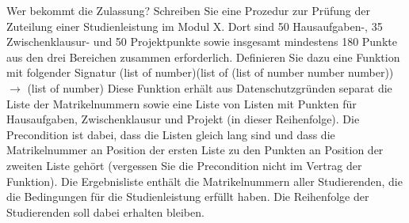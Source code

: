 \documentclass{../preamble}
\begin{document}
\begin{task}[credit = \stars{3}{3}]{Wer bekommt die Zulassung?}
    Schreiben Sie eine Prozedur zur Prüfung der Zuteilung einer Studienleistung im Modul X. Dort sind 50 Hausaufgaben-, 35 Zwischenklausur- und 50 Projektpunkte sowie insgesamt mindestens 180 Punkte aus den drei Bereichen zusammen erforderlich. Definieren Sie dazu eine Funktion  mit folgender Signatur
    \br
    (\textcolor{keywordcolor}{list} of \textcolor{keywordcolor}{number})(\textcolor{keywordcolor}{list} of (\textcolor{keywordcolor}{list} of \textcolor{keywordcolor}{number} \textcolor{keywordcolor}{number} \textcolor{keywordcolor}{number})) \(\rightarrow\) (\textcolor{keywordcolor}{list} of \textcolor{keywordcolor}{number})
    \br
    Diese Funktion erhält aus Datenschutzgründen separat die Liste der Matrikelnummern sowie eine Liste von Listen mit Punkten für Hausaufgaben, Zwischenklausur und Projekt (in dieser Reihenfolge). Die Precondition ist dabei, dass die Listen gleich lang sind und dass die Matrikelnummer an Position  der ersten Liste zu den Punkten an Position  der zweiten Liste gehört (vergessen Sie die Precondition nicht im Vertrag der Funktion). Die Ergebnisliste enthält die Matrikelnummern aller Studierenden, die die Bedingungen für die Studienleistung erfüllt haben. Die Reihenfolge der Studierenden soll dabei erhalten bleiben.

    \begin{solution}
        
    \end{solution}
\end{task}

\clearpage
\end{document}
